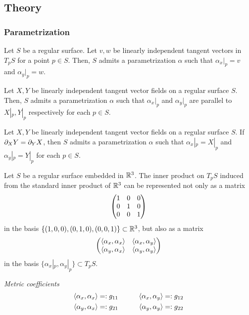 \documentclass{../exp}
\def\a{\alpha}
\begin{document}
\subsection{Theory}

\subsubsection{Parametrization}



\begin{thm}
Let $S$ be a regular surface.
Let $v,w$ be linearly independent tangent vectors in $T_pS$ for a point $p\in S$.
Then, $S$ admits a parametrization $\a$ such that $\a_x|_p=v$ and $\a_y|_p=w$.
\end{thm}
\begin{thm}
Let $X,Y$ be linearly independent tangent vector fields on a regular surface $S$.
Then, $S$ admits a parametrization $\a$ such that $\a_x|_p$ and $\a_y|_p$ are parallel to $X|_p,Y|_p$ respectively for each $p\in S$.
\end{thm}
\begin{thm}
Let $X,Y$ be linearly independent tangent vector fields on a regular surface $S$.
If $\pd_XY=\pd_YX$, then $S$ admits a parametrization $\a$ such that $\a_x|_p=X|_p$ and $\a_y|_p=Y|_p$ for each $p\in S$.
\end{thm}

Let $S$ be a regular surface embedded in $\mathbb{R}^3$.
The inner product on $T_pS$ induced from the standard inner product of $\mathbb{R}^3$ can be represented not only as a matrix
\[\begin{pmatrix}1&0&0\\0&1&0\\0&0&1\end{pmatrix}\]
in the basis $\{(1,0,0),(0,1,0),(0,0,1)\}\subset\mathbb{R}^3$, but also as a matrix
\[\mat{\<\a_x,\a_x\>&\<\a_x,\a_y\>\\\<\a_y,\a_x\>&\<\a_y,\a_y\>}\]
in the basis $\{\a_x|_p,\a_y|_p\}\subset T_pS$.

\begin{defn}
\emph{Metric coefficients}
\begin{alignat*}{2}
\<\a_x,\a_x\>&=:g_{11}&\qquad
\<\a_x,\a_y\>&=:g_{12}\\
\<\a_y,\a_x\>&=:g_{21}&
\<\a_y,\a_y\>&=:g_{22}
\end{alignat*}
\end{defn}
\end{document}
